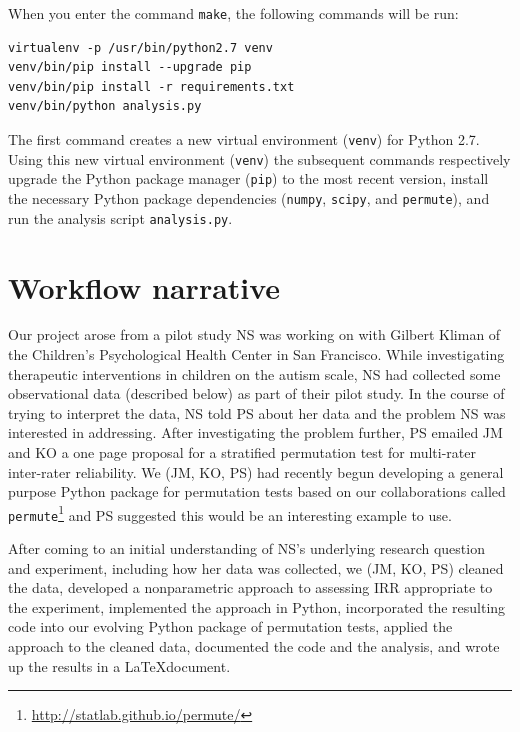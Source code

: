 \documentclass[]{article}
\begin{document}
When you enter the command \texttt{make}, the following commands will be run:
\begin{verbatim}
virtualenv -p /usr/bin/python2.7 venv
venv/bin/pip install --upgrade pip
venv/bin/pip install -r requirements.txt
venv/bin/python analysis.py
\end{verbatim}
The first command creates a new virtual environment (\texttt{venv}) for Python
2.7.
Using this new virtual environment (\texttt{venv}) the subsequent commands
respectively upgrade the Python package manager (\texttt{pip}) to the most
recent version, install the necessary Python package dependencies
(\texttt{numpy}, \texttt{scipy}, and \texttt{permute}), and run the analysis
script \texttt{analysis.py}.

\section{Workflow narrative}\label{workflow-narrative}

Our project arose from a pilot study NS was working on with Gilbert Kliman of
the Children's Psychological Health Center in San Francisco.
While investigating therapeutic interventions in children on the autism scale,
NS had collected some observational data (described below) as part of their
pilot study.
In the course of trying to interpret the data, NS told PS about her data and
the problem NS was interested in addressing.
After investigating the problem further, PS emailed JM and KO a one page
proposal for a stratified permutation test for multi-rater inter-rater
reliability.
We (JM, KO, PS) had recently begun developing a general purpose Python package
for permutation tests based on our collaborations called
\texttt{permute}\footnote{\url{http://statlab.github.io/permute/}} and PS
suggested this would be an interesting example to use.

After coming to an initial understanding of NS's underlying research question
and experiment, including how her data was collected, we (JM, KO, PS) 
cleaned the data, developed a nonparametric approach to assessing IRR
appropriate to the experiment, implemented the approach in Python, incorporated
the resulting code into our evolving Python package of permutation tests,
applied the approach to the cleaned data, documented the code and the analysis,
and wrote up the results in a \LaTeX document. 
\end{document}
